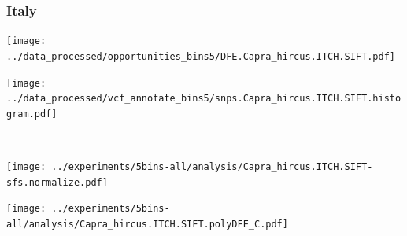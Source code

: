 \subsubsection{Italy}

\begin{minipage}{0.49\linewidth}
    \texttt{[image: ../data\_processed/opportunities\_bins5/DFE.Capra\_hircus.ITCH.SIFT.pdf]}
\end{minipage}
\begin{minipage}{0.49\linewidth}
    \texttt{[image: ../data\_processed/vcf\_annotate\_bins5/snps.Capra\_hircus.ITCH.SIFT.histogram.pdf]}
\end{minipage}
\\
\begin{minipage}{0.49\linewidth}
    \texttt{[image: ../experiments/5bins-all/analysis/Capra\_hircus.ITCH.SIFT-sfs.normalize.pdf]}
\end{minipage}
\begin{minipage}{0.4\linewidth}
    \texttt{[image: ../experiments/5bins-all/analysis/Capra\_hircus.ITCH.SIFT.polyDFE\_C.pdf]}
\end{minipage}
